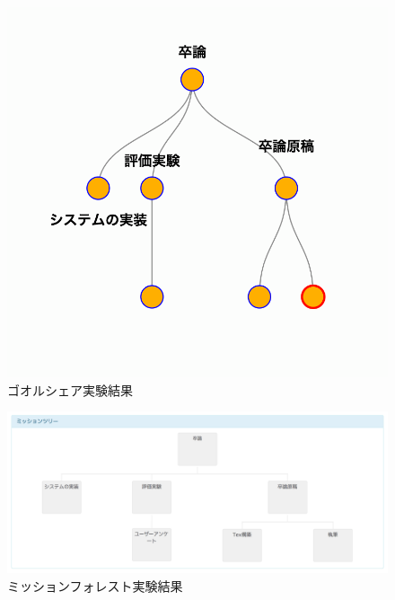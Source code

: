 \begin{figure}[t]
	\begin{center}
		\includegraphics[width=0.9\linewidth]{assets/img/experiment_goalshare.png}
		\caption{ゴオルシェア実験結果}
		\label{img:experiment_goalshare}
	\end{center}
\end{figure}

\begin{figure}[t]
	\begin{center}
		\includegraphics[width=0.9\linewidth]{assets/img/experiment_missionforest.png}
		\caption{ミッションフォレスト実験結果}
		\label{img:experiment_missionforest}
	\end{center}
\end{figure}

